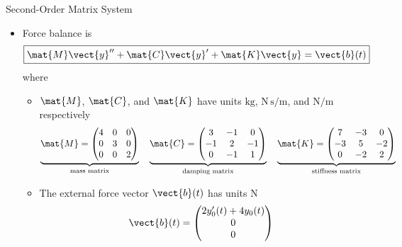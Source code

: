 \begin{frame}{Second-Order Matrix System}
\begin{itemize}
  \item Force balance is
  \[
    \boxed{\mat{M}\vect{y}''+\mat{C}\vect{y}'+\mat{K}\vect{y}=\vect{b}(t)}
  \]
  where
  \begin{itemize}
    \item $\mat{M}$, $\mat{C}$, and $\mat{K}$ have units
    $\mathrm{kg}$, $\mathrm{N\,s/m}$, and $\mathrm{N/m}$ respectively
    \[
      \underbrace{\mat{M}=\begin{pmatrix}4&0&0\\0&3&0\\0&0&2\end{pmatrix}}_{\text{mass matrix}}\quad
      \underbrace{\mat{C}=\begin{pmatrix}3&-1&0\\-1&2&-1\\0&-1&1\end{pmatrix}}_{\text{damping matrix}}\quad
      \underbrace{\mat{K}=\begin{pmatrix}7&-3&0\\-3&5&-2\\0&-2&2\end{pmatrix}}_{\text{stiffness matrix}}
    \]
    \item The external force vector $\vect{b}(t)$ has units $\mathrm{N}$
    \[
      \vect{b}(t)=\begin{pmatrix}2y_0'(t)+4y_0(t)\\0\\0\end{pmatrix}
    \]
  \end{itemize}
\end{itemize}
\end{frame}

